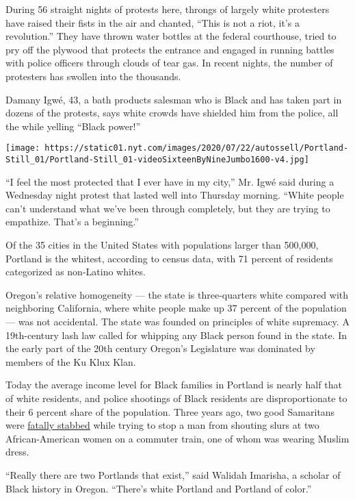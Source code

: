 During 56 straight nights of protests here, throngs of largely white
protesters have raised their fists in the air and chanted, ``This is not
a riot, it's a revolution.'' They have thrown water bottles at the
federal courthouse, tried to pry off the plywood that protects the
entrance and engaged in running battles with police officers through
clouds of tear gas. In recent nights, the number of protesters has
swollen into the thousands.

Damany Igwé, 43, a bath products salesman who is Black and has taken
part in dozens of the protests, says white crowds have shielded him from
the police, all the while yelling ``Black power!''

\texttt{[image: https://static01.nyt.com/images/2020/07/22/autossell/Portland-Still\_01/Portland-Still\_01-videoSixteenByNineJumbo1600-v4.jpg]}

``I feel the most protected that I ever have in my city,'' Mr. Igwé said
during a Wednesday night protest that lasted well into Thursday morning.
``White people can't understand what we've been through completely, but
they are trying to empathize. That's a beginning.''

Of the 35 cities in the United States with populations larger than
500,000, Portland is the whitest, according to census data, with 71
percent of residents categorized as non-Latino whites.

Oregon's relative homogeneity --- the state is three-quarters white
compared with neighboring California, where white people make up 37
percent of the population --- was not accidental. The state was founded
on principles of white supremacy. A 19th-century lash law called for
whipping any Black person found in the state. In the early part of the
20th century Oregon's Legislature was dominated by members of the Ku
Klux Klan.

Today the average income level for Black families in Portland is nearly
half that of white residents, and police shootings of Black residents
are disproportionate to their 6 percent share of the population. Three
years ago, two good Samaritans were
\href{https://www.nytimes.com/2017/05/27/us/portland-train-attack-muslim-rant.html}{fatally
stabbed} while trying to stop a man from shouting slurs at two
African-American women on a commuter train, one of whom was wearing
Muslim dress.

``Really there are two Portlands that exist,'' said Walidah Imarisha, a
scholar of Black history in Oregon. ``There's white Portland and
Portland of color.''

